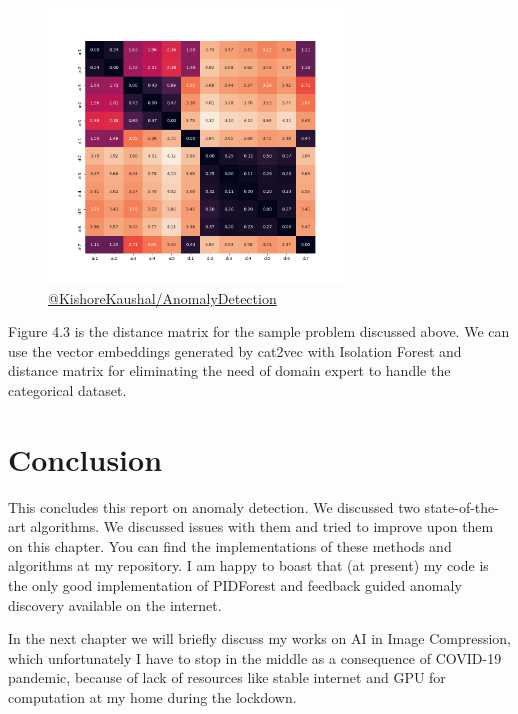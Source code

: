 \begin{figure}[!ht]
    \label{fig:distance-matrix}
    \centering
    \includegraphics[width=0.7\textwidth]{../fig/chapter4/InterFeatureDistance.png}
    {\href{https://github.com/KishoreKaushal/AnomalyDetection/blob/master/isolationforest/cat2vec.py}{@KishoreKaushal/AnomalyDetection}}
\end{figure}



Figure 4.3 is the distance matrix for the sample problem discussed above.
We can use the vector embeddings generated by cat2vec with Isolation Forest and distance matrix for eliminating the need of domain expert to handle the categorical dataset.

\section{Conclusion}
\label{sec:conclusion}

This concludes this report on anomaly detection.
We discussed two state-of-the-art algorithms.
We discussed issues with them and tried to improve upon them on this chapter.
You can find the implementations of these methods and algorithms at my repository.
I am happy to boast that (at present) my code is the only good implementation of PIDForest and feedback guided anomaly discovery available on the internet.

In the next chapter we will briefly discuss my works on AI in Image Compression, which unfortunately I have to stop in the middle as a consequence of COVID-19 pandemic, because of lack of resources like stable internet and GPU for computation at my home during the lockdown.